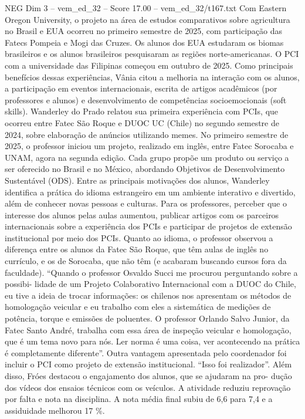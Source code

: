 \begin{textsample}{NEG Dim 3 – vem\_ed\_32 – Score 17.00 – vem\_ed\_32/t167.txt}
Com Eastern Oregon University, o projeto na área de estudos comparativos sobre agricultura no Brasil e EUA ocorreu no primeiro semestre de 2025, com participação das Fatecs Pompeia e Mogi das Cruzes.
Os alunos dos EUA estudaram os biomas brasileiros e os alunos brasileiros pesquisaram as regiões norte-americanas.
O PCI com a universidade das Filipinas começou em outubro de 2025.
Como principais benefícios dessas experiências, Vânia citou a melhoria na interação com os alunos, a participação em eventos internacionais, escrita de artigos acadêmicos (por professores e alunos) e desenvolvimento de competências socioemocionais (soft skills).
Wanderley do Prado relatou sua primeira experiência com PCIs, que ocorreu entre Fatec São Roque e DUOC UC (Chile) no segundo semestre de 2024, sobre elaboração de anúncios utilizando memes.
No primeiro semestre de 2025, o professor iniciou um projeto, realizado em inglês, entre Fatec Sorocaba e UNAM, agora na segunda edição.
Cada grupo propõe um produto ou serviço a ser oferecido no Brasil e no México, abordando Objetivos de Desenvolvimento Sustentável (ODS).
Entre as principais motivações dos alunos, Wanderley identifica a prática do idioma estrangeiro em um ambiente interativo e divertido, além de conhecer novas pessoas e culturas.
Para os professores, perceber que o interesse dos alunos pelas aulas aumentou, publicar artigos com os parceiros internacionais sobre a experiência dos PCIs e participar de projetos de extensão institucional por meio dos PCIs.
Quanto ao idioma, o professor observou a diferença entre os alunos da Fatec São Roque, que têm aulas de inglês no currículo, e os de Sorocaba, que não têm (e acabaram buscando cursos fora da faculdade). “Quando o professor Osvaldo Succi me procurou perguntando sobre a possibi- lidade de um Projeto Colaborativo Internacional com a DUOC do Chile, eu tive a ideia de trocar informações: os chilenos nos apresentam os métodos de homologação veicular e eu trabalho com eles a sistemática de medições de potência, torque e emissões de poluentes.
O professor Orlando Salvo Junior, da Fatec Santo André, trabalha com essa área de inspeção veicular e homologação, que é um tema novo para nós.
Ler norma é uma coisa, ver acontecendo na prática é completamente diferente”.
Outra vantagem apresentada pelo coordenador foi incluir o PCI como projeto de extensão institucional. “Isso foi realizador”.
Além disso, Fróes destacou o engajamento dos alunos, que se ajudaram na pro- dução dos vídeos dos ensaios técnicos com os veículos.
A atividade reduziu reprovação por falta e nota na disciplina.
A nota média final subiu de 6,6 para 7,4 e a assiduidade melhorou 17 \%.

\end{textsample}
